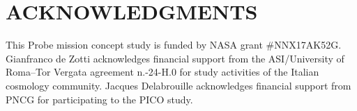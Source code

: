 \documentclass[]{spie}  %
\begin{document}




\section{ACKNOWLEDGMENTS}

This Probe mission concept study is funded by NASA grant \#NNX17AK52G.  Gianfranco de Zotti acknowledges financial support from the ASI/University of
Roma--Tor Vergata agreement n.-24-H.0 for study activities of the Italian cosmology community. Jacques
Delabrouille acknowledges financial support from PNCG for participating to the PICO study.


\end{document}
